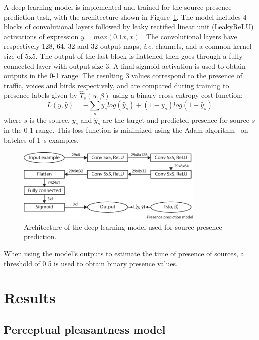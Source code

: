 \documentclass[11pt,a4paper]{article}
\begin{document}
A deep learning model is implemented and trained for the source presence prediction task, with the architecture shown in Figure~\ref{fig:deep_arch}. The model includes 4 blocks of convolutional layers followed by leaky rectified linear unit (LeakyReLU) activations of expression $y = max(0.1x, x)$ . The convolutional layers have respectively 128, 64, 32 and 32 output maps, \textit{i.e.} channels, and a common kernel size of 5x5. The output of the last block is flattened then goes through a fully connected layer with output size 3. A final sigmoid activation is used to obtain outputs in the 0-1 range. The resulting 3 values correspond to the presence of traffic, voices and birds respectively, and are compared during training to presence labels given by $\hat T_s(\alpha, \beta)$ using a binary cross-entropy cost function:
\begin{equation}
L(y, \hat y) = -\sum_s y_s log\left(\hat y_s\right) + (1-y_s) log\left(1-\hat y_s\right)
\end{equation}
where $s$ is the source, $y_s$ and $\hat y_s$ are the target and predicted presence for source $s$ in the 0-1 range. This loss function is minimized using the Adam algorithm~\cite{kingma2015} on batches of 1~s examples.\\

\begin{figure}[!h]
    \centering
    \includegraphics[width=0.8\textwidth]{figures/deep_arch.pdf}
    \caption{Architecture of the deep learning model used for source presence prediction.}\label{fig:deep_arch}
\end{figure}

When using the model's outputs to estimate the time of presence of sources, a threshold of 0.5 is used to obtain binary presence values.


\section{Results}
\label{sec:results}

\subsection{Perceptual pleasantness model}
\label{sec:results_perc}
\end{document}
